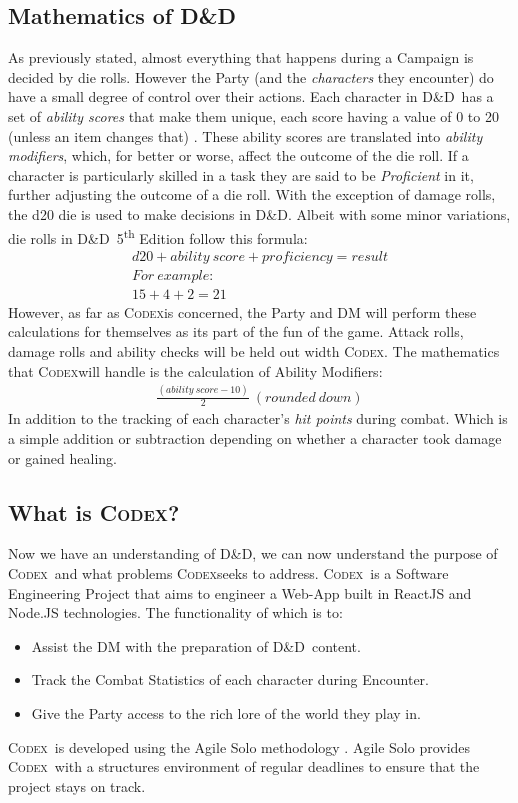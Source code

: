 \documentclass[progress]{cmpreport}
\newcommand{\dnd}{D\&D}
\newcommand{\Codex}{\textsc{Codex}}
\begin{document}
	\subsection{Mathematics of \dnd}
	As previously stated, almost everything that happens during a Campaign is decided by die rolls. However the Party (and the \emph{characters} they encounter) do have a small degree of control over their actions. Each character in \dnd \ has a set of \emph{ability scores} that make them unique, each score having a value of 0 to 20 (unless an item changes that) \citep{PlayerHandbook}. These ability scores are translated into \emph{ability modifiers}, which, for better or worse, affect the outcome of the die roll. If a character is particularly skilled in a task they are said to be \emph{Proficient} in it, further adjusting the outcome of a die roll. With the exception of damage rolls, the d20 die is used to make decisions in \dnd. Albeit with some minor variations, die rolls in \dnd \ 5\textsuperscript{th} Edition follow this formula:
	\begin{gather*}
		d20 + ability \ score + proficiency = result \\
		For \ example: \\
		15 + 4 + 2 = 21
	\end{gather*}
	However, as far as \Codex is concerned, the Party and DM will perform these calculations for themselves as its part of the fun of the game. Attack rolls, damage rolls and ability checks will be held out width \Codex. The mathematics that \Codex will handle is the calculation of Ability Modifiers:
	\begin{gather*}
		\frac{(ability \ score - 10)}{2} \ (rounded \ down)
	\end{gather*}
	In addition to the tracking of each character's \emph{hit points} during combat. Which is a simple addition or subtraction depending on whether a character took damage or gained healing.	

	\subsection{What is \Codex?} \label{subsec:WIC}
	Now we have an understanding of \dnd, we can now understand the purpose of \Codex \ and what problems \Codex seeks to address. \Codex \ is a Software Engineering Project that aims to engineer a Web-App built in ReactJS and Node.JS technologies. The functionality of which is to:
	\begin{itemize}
		\item Assist the DM with the preparation of \dnd \ content.
		\item Track the Combat Statistics of each character during Encounter.
		\item Give the Party access to the rich lore of the world they play in.
	\end{itemize}
	\Codex \ is developed using the Agile Solo methodology \citep{AgileSolo}. Agile Solo provides \Codex \ with a structures environment of regular deadlines to ensure that the project stays on track. 
	
\end{document}
